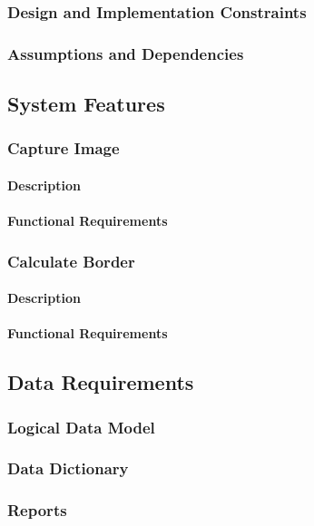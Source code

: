         \subsubsection{Design and Implementation Constraints}
        \subsubsection{Assumptions and Dependencies}

    \subsection{System Features}

        \subsubsection{Capture Image}
            \paragraph{Description}
            \paragraph{Functional Requirements}

        \subsubsection{Calculate Border}
            \paragraph{Description}
            \paragraph{Functional Requirements}

    \subsection{Data Requirements}
        \subsubsection{Logical Data Model}
        \subsubsection{Data Dictionary}
        \subsubsection{Reports}







